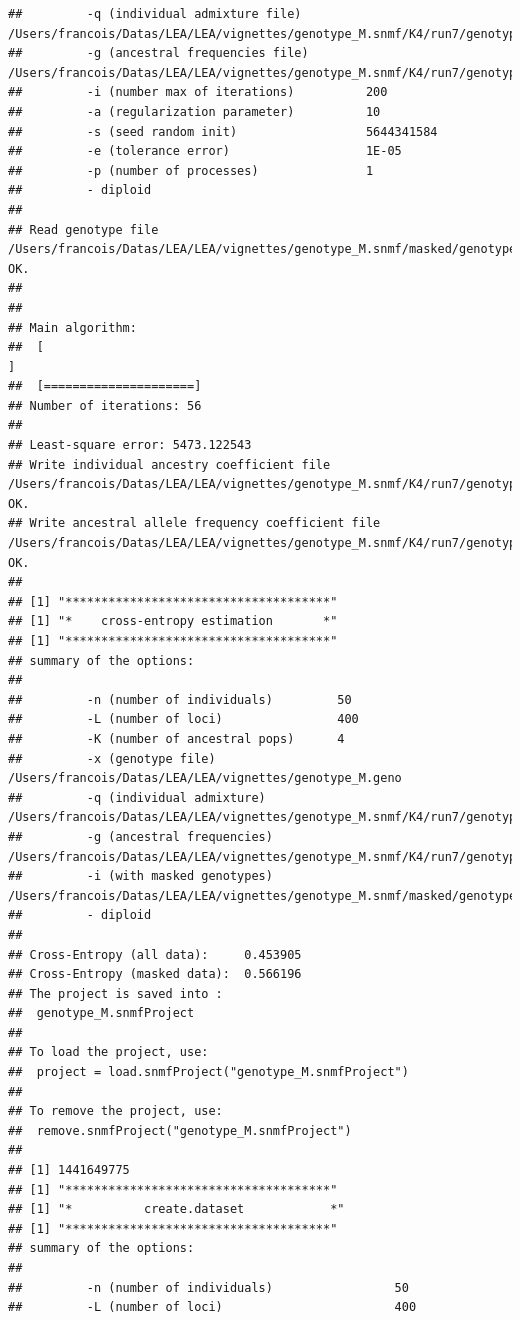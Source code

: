 \documentclass[12pt,a4paper,oneside]{article}\usepackage[]{graphicx}\usepackage[]{color}
\makeatletter
\newenvironment{kframe}{%
 \def\at@end@of@kframe{}%
 \ifinner\ifhmode%
  \def\at@end@of@kframe{\end{minipage}}%
  \begin{minipage}{\columnwidth}%
 \fi\fi%
 \def\FrameCommand##1{\hskip\@totalleftmargin \hskip-\fboxsep
 \colorbox{shadecolor}{##1}\hskip-\fboxsep
     \hskip-\linewidth \hskip-\@totalleftmargin \hskip\columnwidth}%
 \MakeFramed {\advance\hsize-\width
   \@totalleftmargin\z@ \linewidth\hsize
   \@setminipage}}%
 {\par\unskip\endMakeFramed%
 \at@end@of@kframe}
\newenvironment{knitrout}{}{} %
\makeatother
\begin{document}
\begin{knitrout}
\begin{kframe}
\begin{verbatim}
##         -q (individual admixture file)         /Users/francois/Datas/LEA/LEA/vignettes/genotype_M.snmf/K4/run7/genotype_M_r7.4.Q
##         -g (ancestral frequencies file)        /Users/francois/Datas/LEA/LEA/vignettes/genotype_M.snmf/K4/run7/genotype_M_r7.4.G
##         -i (number max of iterations)          200
##         -a (regularization parameter)          10
##         -s (seed random init)                  5644341584
##         -e (tolerance error)                   1E-05
##         -p (number of processes)               1
##         - diploid
## 
## Read genotype file /Users/francois/Datas/LEA/LEA/vignettes/genotype_M.snmf/masked/genotype_M_I.geno:		OK.
## 
## 
## Main algorithm:
## 	[                                                                           ]
## 	[=====================]
## Number of iterations: 56
## 
## Least-square error: 5473.122543
## Write individual ancestry coefficient file /Users/francois/Datas/LEA/LEA/vignettes/genotype_M.snmf/K4/run7/genotype_M_r7.4.Q:		OK.
## Write ancestral allele frequency coefficient file /Users/francois/Datas/LEA/LEA/vignettes/genotype_M.snmf/K4/run7/genotype_M_r7.4.G:	OK.
## 
## [1] "*************************************"
## [1] "*    cross-entropy estimation       *"
## [1] "*************************************"
## summary of the options:
## 
##         -n (number of individuals)         50
##         -L (number of loci)                400
##         -K (number of ancestral pops)      4
##         -x (genotype file)                 /Users/francois/Datas/LEA/LEA/vignettes/genotype_M.geno
##         -q (individual admixture)          /Users/francois/Datas/LEA/LEA/vignettes/genotype_M.snmf/K4/run7/genotype_M_r7.4.Q
##         -g (ancestral frequencies)         /Users/francois/Datas/LEA/LEA/vignettes/genotype_M.snmf/K4/run7/genotype_M_r7.4.G
##         -i (with masked genotypes)         /Users/francois/Datas/LEA/LEA/vignettes/genotype_M.snmf/masked/genotype_M_I.geno
##         - diploid
## 
## Cross-Entropy (all data):	 0.453905
## Cross-Entropy (masked data):	 0.566196
## The project is saved into :
##  genotype_M.snmfProject 
## 
## To load the project, use:
##  project = load.snmfProject("genotype_M.snmfProject")
## 
## To remove the project, use:
##  remove.snmfProject("genotype_M.snmfProject")
## 
## [1] 1441649775
## [1] "*************************************"
## [1] "*          create.dataset            *"
## [1] "*************************************"
## summary of the options:
## 
##         -n (number of individuals)                 50
##         -L (number of loci)                        400

\end{verbatim}
\end{kframe}
\end{knitrout}
\end{document}
